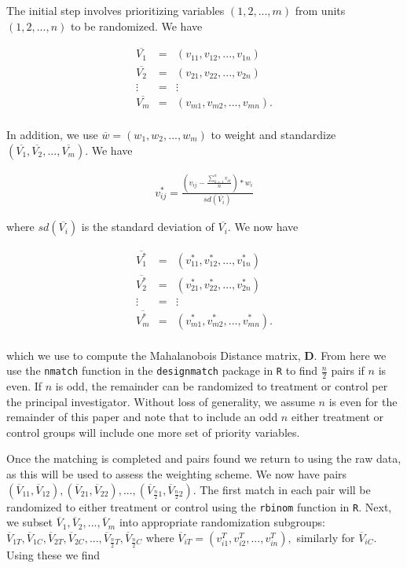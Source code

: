 \documentclass[]{sagej}
\begin{document}
The initial step involves prioritizing variables \((1, 2,..., m)\) from
units \((1, 2, ..., n)\) to be randomized. We have

\begin{eqnarray*}
 \overline{V_1} & = & (v_{11}, v_{12},..., v_{1n})\\
 \overline{V_2} & = & (v_{21}, v_{22},..., v_{2n})\\
 \vdots & = & \vdots\\    
 \overline{V_m} & = & (v_{m1}, v_{m2},..., v_{mn}).\\
 \end{eqnarray*}

In addition, we use \(\overline{w} = (w_{1}, w_{2},..., w_{m})\) to
weight and standardize
\((\overline{V_1}, \overline{V_2}, ..., \overline{V_m}).\) We have

\begin{eqnarray*}
v^{*}_{ij} = \frac{(v_{ij} - \frac{\sum _{k=1}^{n}v_{ik}}{n})*w_i}{sd(\overline{V_i})} 
 \end{eqnarray*}

where \(sd(\overline{V_i})\) is the standard deviation of
\(\overline{V_i}.\) We now have

\begin{eqnarray*}
 \overline{V_1^*} & = & (v_{11}^*, v_{12}^*,..., v_{1n}^*)\\
 \overline{V_2^*} & = & (v_{21}^*, v_{22}^*,..., v_{2n}^*)\\
 \vdots & = & \vdots\\    
 \overline{V_m^*} & = & (v_{m1}^*, v_{m2}^*,..., v_{mn}^*).\\
 \end{eqnarray*}

which we use to compute the Mahalanobois Distance matrix, \textbf{D}.
From here we use the \texttt{nmatch} function in the
\texttt{designmatch} \citep{doi} package in \texttt{R} to find
\(\frac{n}{2}\) pairs if \(n\) is even. If \(n\) is odd, the remainder
can be randomized to treatment or control per the principal
investigator. Without loss of generality, we assume \(n\) is even for
the remainder of this paper and note that to include an odd \(n\) either
treatment or control groups will include one more set of priority
variables.

Once the matching is completed and pairs found we return to using the
raw data, as this will be used to assess the weighting scheme. We now
have pairs
\((\overline{V}_{11}, \overline{V}_{12}), (\overline{V}_{21}, \overline{V}_{22}), ..., (\overline{V}_{\frac{n}{2}1}, \overline{V}_{\frac{n}{2}2}).\)
The first match in each pair will be randomized to either treatment or
control using the \texttt{rbinom} function in \texttt{R}. Next, we
subset \(\overline{V}_1, \overline{V}_2, ..., \overline{V}_m\) into
appropriate randomization subgroups:
\(\overline{V}_{1T}, \overline{V}_{1C}, \overline{V}_{2T}, \overline{V}_{2C},..., \overline{V}_{\frac{n}{2}T}, \overline{V}_{\frac{n}{2}C}\)
where \(\overline{V}_{iT} = (v_{i1}^T, v_{i2}^T,..., v_{in}^T),\)
similarly for \(\overline{V}_{iC}.\) Using these we find
\end{document}
